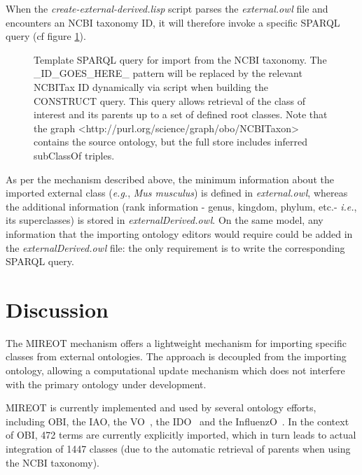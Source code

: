 \documentclass[jou]{ao2e}%
\begin{document}
When the \emph{create-external-derived.lisp} script parses the \emph{external.owl} file and encounters an NCBI taxonomy ID, it will therefore invoke a specific SPARQL query (cf figure \ref{fig:sparql2}). 

\begin{figure}[t]
\scriptsize
 
\caption{Template SPARQL query for import from the NCBI taxonomy. The \_ID\_GOES\_HERE\_ pattern will be replaced by the relevant NCBITax ID dynamically via script when building the CONSTRUCT query. This query allows retrieval of the class of interest and its parents up to a set of defined root classes. Note that the graph <http://purl.org/science/graph/obo/NCBITaxon> contains the source ontology, but the full store includes inferred subClassOf triples.}
\label{fig:sparql2}
\end{figure}
As per the mechanism described above, the minimum information about the imported external class (\emph{e.g.}, \emph{Mus musculus}) is defined in \emph{external.owl}, whereas the additional information (rank information - genus, kingdom, phylum, etc.- \emph{i.e.}, its  superclasses) is stored in \emph{ externalDerived.owl}.
On the same model, any information that the importing ontology editors would require could be added in the \emph{externalDerived.owl} file: the only requirement is to write the corresponding SPARQL query.


\section*{Discussion}

The MIREOT mechanism offers a lightweight mechanism for importing specific classes from external ontologies. The approach is decoupled from the importing ontology, allowing a computational update mechanism which does not interfere with the primary ontology under development.

\ac{MIREOT} is currently implemented and used by several ontology efforts, including \ac{OBI}, the \ac{IAO}, the \ac{VO}~\citep{VO}, the \ac{IDO}~\citep{IDO} and the \ac{InfluenzO}~\citep{InfluenzO}.
In the context of \ac{OBI}, 472 terms are currently explicitly imported, which in turn leads to actual integration of 1447 classes (due to the automatic retrieval of parents when using the NCBI taxonomy). 
\end{document}
